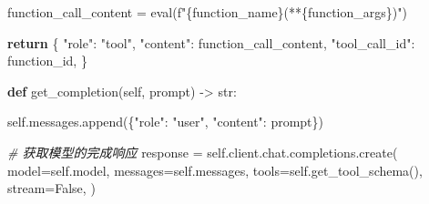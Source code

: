 \documentclass[
]{article}
\newenvironment{Shaded}{}{}
\newcommand{\BuiltInTok}[1]{\textcolor[rgb]{0.00,0.50,0.00}{#1}}
\newcommand{\CommentTok}[1]{\textcolor[rgb]{0.38,0.63,0.69}{\textit{#1}}}
\newcommand{\ControlFlowTok}[1]{\textcolor[rgb]{0.00,0.44,0.13}{\textbf{#1}}}
\newcommand{\KeywordTok}[1]{\textcolor[rgb]{0.00,0.44,0.13}{\textbf{#1}}}
\newcommand{\NormalTok}[1]{#1}
\newcommand{\OperatorTok}[1]{\textcolor[rgb]{0.40,0.40,0.40}{#1}}
\newcommand{\SpecialCharTok}[1]{\textcolor[rgb]{0.25,0.44,0.63}{#1}}
\newcommand{\SpecialStringTok}[1]{\textcolor[rgb]{0.73,0.40,0.53}{#1}}
\newcommand{\StringTok}[1]{\textcolor[rgb]{0.25,0.44,0.63}{#1}}
\newcommand{\VariableTok}[1]{\textcolor[rgb]{0.10,0.09,0.49}{#1}}
\begin{document}
\begin{Shaded}
\begin{Highlighting}[]
\NormalTok{        function\_call\_content }\OperatorTok{=} \BuiltInTok{eval}\NormalTok{(}\SpecialStringTok{f"}\SpecialCharTok{\{}\NormalTok{function\_name}\SpecialCharTok{\}}\SpecialStringTok{(**}\SpecialCharTok{\{}\NormalTok{function\_args}\SpecialCharTok{\}}\SpecialStringTok{)"}\NormalTok{)}

        \ControlFlowTok{return}\NormalTok{ \{}
            \StringTok{"role"}\NormalTok{: }\StringTok{"tool"}\NormalTok{,}
            \StringTok{"content"}\NormalTok{: function\_call\_content,}
            \StringTok{"tool\_call\_id"}\NormalTok{: function\_id,}
\NormalTok{        \}}

    \KeywordTok{def}\NormalTok{ get\_completion(}\VariableTok{self}\NormalTok{, prompt) }\OperatorTok{{-}\textgreater{}} \BuiltInTok{str}\NormalTok{:}

        \VariableTok{self}\NormalTok{.messages.append(\{}\StringTok{"role"}\NormalTok{: }\StringTok{"user"}\NormalTok{, }\StringTok{"content"}\NormalTok{: prompt\})}

        \CommentTok{\# 获取模型的完成响应}
\NormalTok{        response }\OperatorTok{=} \VariableTok{self}\NormalTok{.client.chat.completions.create(}
\NormalTok{            model}\OperatorTok{=}\VariableTok{self}\NormalTok{.model,}
\NormalTok{            messages}\OperatorTok{=}\VariableTok{self}\NormalTok{.messages,}
\NormalTok{            tools}\OperatorTok{=}\VariableTok{self}\NormalTok{.get\_tool\_schema(),}
\NormalTok{            stream}\OperatorTok{=}\VariableTok{False}\NormalTok{,}
\NormalTok{        )}
        

\end{Highlighting}
\end{Shaded}
\end{document}
